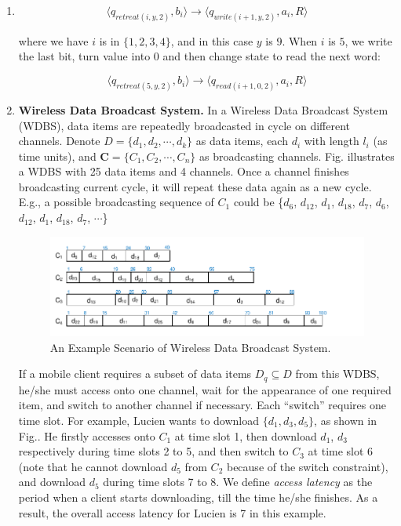\documentclass[12pt,a4paper]{article}
\makeatletter
\newtheorem*{solution}{Solution}
\theoremstyle{definition}
\renewenvironment{solution}[1][Solution] {\par\pushQED{\qed}\normalfont\topsep6\p@\@plus6\p@\relax\trivlist\item[\hskip\labelsep\bfseries#1\@addpunct{.}]\ignorespaces}{\popQED\endtrivlist\@endpefalse} \makeatother
\makeatother
\begin{document}
\begin{enumerate}
\begin{solution}
\begin{itemize}
		\begin{equation*}
			\langle q_{retreat(i,y,2)}, b_{i} \rangle \rightarrow \langle q_{write(i + 1,y,2)}, a_{i},   R\rangle
		\end{equation*} 
		
		where we have $i$ is in $\{1, 2, 3, 4\}$, and in this case $y$ is $9$. When $i$ is $5$, we write the last bit, turn value into $0$ and then  change state to read the next word:

		
		\begin{equation*}
			\langle q_{retreat(5,y,2)}, b_{i} \rangle \rightarrow \langle q_{read(i + 1,0,2)}, a_{i},   R\rangle
		\end{equation*} 

	\end{itemize}
	
\end{solution}






\item \textbf{Wireless Data Broadcast System.}
In a Wireless Data Broadcast System (WDBS), data items are repeatedly broadcasted in cycle on different channels. Denote $D = \{d_1, d_2,\cdots, d_k\}$ as data items, each $d_i$ with length $l_i$ (as time units), and $\mathbf{C}=\{C_1, C_2, \cdots, C_n\}$ as broadcasting channels. Fig. illustrates a WDBS with 25 data items and 4 channels. Once a channel finishes broadcasting current cycle, it will repeat these data again as a new cycle. E.g., a possible broadcasting sequence of $C_1$ could be \{$d_6$, $d_{12}$, $d_1$, $d_{18}$, $d_7$, $d_6$, $d_{12}$, $d_1$, $d_{18}$, $d_7$, $\cdots$\}

\begin{figure}[h]
	\centering
	\includegraphics[scale=1]{Fig-Broadcast.pdf}
	\caption{An Example Scenario of Wireless Data Broadcast System.} \label{Fig-Broadcast}
\end{figure}

If a mobile client requires a subset of data items $D_q \subseteq D$ from this WDBS, he/she must access onto one channel, wait for the appearance of one required item, and switch to another channel if necessary. Each ``switch'' requires one time slot. For example, Lucien wants to download $\{d_1, d_3, d_5\}$, as shown in Fig.. He firstly accesses onto $C_1$ at time slot 1, then download $d_1$, $d_3$ respectively during time slots 2 to 5, and then switch to $C_3$ at time slot 6 (note that he cannot download $d_5$ from $C_2$ because of the switch constraint), and download $d_5$ during time slots 7 to 8. We define \emph{access latency} as the period when a client starts downloading, till the time he/she finishes. As a result, the overall access latency for Lucien is 7 in this example.


\end{enumerate}
\end{document}
